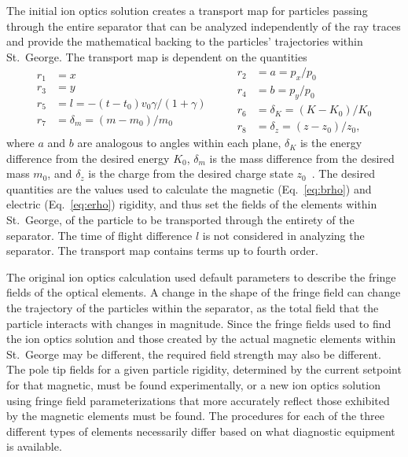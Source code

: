 The initial ion optics solution creates a transport map for particles passing
through the entire separator that can be analyzed independently of the ray
traces and provide the mathematical backing to the particles' trajectories
within St.\ George. The transport map is dependent on the quantities
\begin{equation}
    \label{eq:cosyvars}
    \begin{split}
        r_1 &= x \\
        r_3 &= y \\
        r_5 &= l = -(t - t_0)v_0\gamma/(1 + \gamma) \\
        r_7 &= \delta_m = (m - m_0)/m_0
    \end{split}
    \quad\quad
    \begin{split}
        r_2 &= a = p_x/p_0 \\
        r_4 &= b = p_y/p_0 \\
        r_6 &= \delta_K = (K - K_0)/K_0\\
        r_8 &= \delta_z = (z - z_0)/z_0,
    \end{split}
\end{equation}
where $a$ and $b$ are analogous to angles within each plane, $\delta_K$ is the
energy difference from the desired energy $K_0$,
$\delta_m$ is the mass difference from the desired mass $m_0$, and
$\delta_z$ is the charge from the desired charge state $z_0$~\cite{COSY}.
The desired quantities are the values used to calculate the magnetic
(Eq.~\ref{eq:brho}) and electric (Eq.~\ref{eq:erho}) rigidity, and thus set the
fields of the elements within St.\ George,
of the particle to be transported through the entirety of the separator.
The time of flight difference $l$ is not considered in analyzing the separator.
The transport map contains terms up to fourth order.

The original ion optics calculation used default parameters to describe the
fringe fields of the optical elements. A change in the shape of the fringe
field can change the trajectory of the particles within the separator, as the
total field that the particle interacts with changes in magnitude. Since the
fringe fields used to find the ion optics solution and those created by the
actual magnetic elements within St.\ George may be different, the required
field strength may also be different. The pole tip fields for a given particle
rigidity, determined by the current setpoint for that magnetic, must be found
experimentally, or a new ion optics solution using fringe field
parameterizations that more accurately reflect those exhibited by the magnetic
elements must be found. The procedures for each of the three different types
of elements necessarily differ based on what diagnostic equipment is available.

